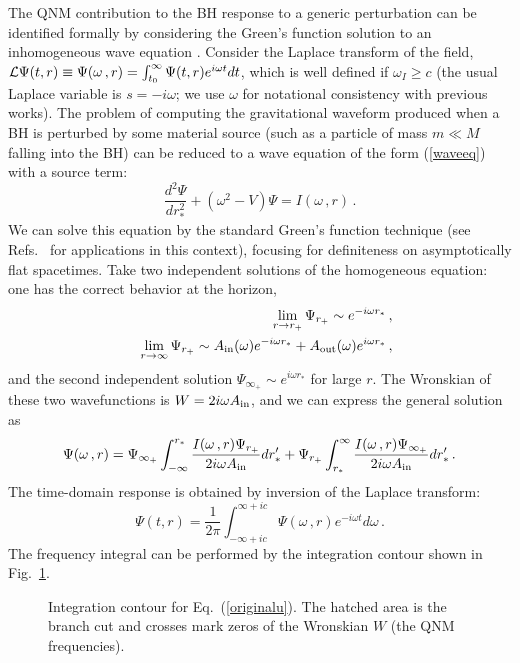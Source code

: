 \documentclass[]{iopart}
\def\be{\begin{equation}}
\def\ee{\end{equation}}
\def\beq{\begin{eqnarray}}
\def\eeq{\end{eqnarray}}
\begin{document}
The QNM contribution to the BH response to a generic perturbation can be
identified formally by considering the Green's function solution to an
inhomogeneous wave equation
\cite{Leaver:1986gd,nollertschmidt,Andersson:1995zk,Andersson:1996cm,Berti:2006wq}.
Consider the Laplace transform of the field, ${\cal L}\Psi(t,r) \equiv
\Psi(\omega\,,r)= \int_{t_0}^{\infty} \Psi(t,r)e^{i\omega t} dt$, which is
well defined if $\omega_I\geq c$ (the usual Laplace variable is $s=-i\omega$;
we use $\omega$ for notational consistency with previous works).
%
The problem of computing the gravitational waveform produced when a BH is
perturbed by some material source (such as a particle of mass $m\ll M$ falling
into the BH) can be reduced to a wave equation of the form (\ref{waveeq}) with
a source term:
%
\be
\frac{d^2\Psi}{dr_*^2}+\left (\omega^2-V\right)\Psi=I(\omega\,,r)\,.
\label{waveeqsources}
\ee
%
We can solve this equation by the standard Green's function technique
\cite{morsefeshbach} (see
Refs.~\cite{Leaver:1986gd,nollertschmidt,Andersson:1995zk,Andersson:1996cm,Berti:2006wq}
for applications in this context), focusing for definiteness on asymptotically
flat spacetimes.  Take two independent solutions of the homogeneous equation:
one has the correct behavior at the horizon,
%
\beq & & \lim_{r \to r_+} \Psi_{r_+}\sim e^{-i\omega r_*}\,,
\label{asrplus}\\
& & \lim_{r \to \infty }\Psi_{r_+}\sim A_{\rm
in}(\omega)e^{-i\omega r_*}+A_{\rm out}(\omega)e^{i\omega r_*}\,,
\eeq
%
and the second independent solution $\Psi_{\infty_+} \sim e^{i\omega r_*}$ for
large $r$. The Wronskian of these two wavefunctions is $W=2i\omega A_{\rm
  in}$, and we can express the general solution as \cite{Leaver:1986gd}
%
\be
\Psi(\omega\,,r)=\Psi_{\infty_+}\int_{-\infty}^{r_*}\frac{I(\omega\,,r)\Psi_{r_+}}{2i\omega
A_{\rm in}}dr_*'
+\Psi_{r_+}\int_{r_*}^{\infty}\frac{I(\omega\,,r)\Psi_{\infty_+}}{2i\omega
A_{\rm in}}dr_*' \,. \ee
%
The time-domain response is obtained by inversion of the Laplace transform:
%
\be \Psi(t,r)=\frac{1}{2\pi}\int_{-\infty +ic}^{\infty+ic}
\Psi(\omega\,, r)e^{-i\omega t} d\omega\,.\label{originalu} \ee
%
The frequency integral can be performed by the integration contour shown in
Fig.~\ref{fig:contour2}.
%
\begin{figure}[ht]
\begin{center}
\caption{Integration contour for Eq.~(\ref{originalu}). The hatched area is
  the branch cut and crosses mark zeros of the Wronskian $W$ (the QNM
  frequencies).} \label{fig:contour2}
\end{center}
\end{figure}
\end{document}
